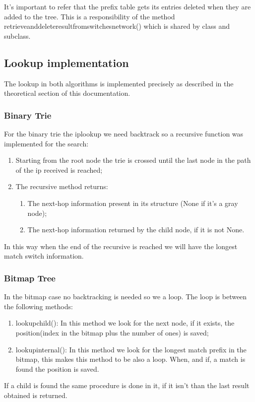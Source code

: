 \documentclass[]{report}
\begin{document}
It’s important to refer that the prefix table gets its entries deleted when they are added to the tree. This is a responsibility of the method retrieve\textunderscore and\textunderscore delete\textunderscore result\textunderscore from\textunderscore switches\textunderscore network() which is shared by class and subclass.

\subsection{Lookup implementation}

The lookup in both algorithms is implemented precisely as described in the theoretical section of this documentation.

\subsubsection{Binary Trie}

For the binary trie the ip\textunderscore lookup we need backtrack so a recursive function was implemented for the search:
\begin{enumerate}
\item Starting from the root node the trie is crossed until the last node in the path of the ip received is reached;
\item The recursive method returns:
\begin{enumerate}
\item The next-hop information present in its structure (None if it’s a gray node);
\item The next-hop information returned by the child node, if it is not None.
\end{enumerate}
\end{enumerate}

In this way when the end of the recursive is reached we will have the longest match switch information.


\subsubsection{Bitmap Tree}
In the bitmap case no backtracking is needed so we a loop. The loop is between the following methods:
\begin{enumerate}
\item lookup\textunderscore child(): In this method we look for the next node, if it exists, the position(index in the bitmap plus the number of ones) is saved;
\item lookup\textunderscore internal(): In this method we look for the longest match prefix in the bitmap, this makes this method to be also a loop. When, and if, a match is found the position is saved.
\end{enumerate}
If a child is found the same procedure is done in it, if it isn’t than the last result obtained is returned.
\end{document}
